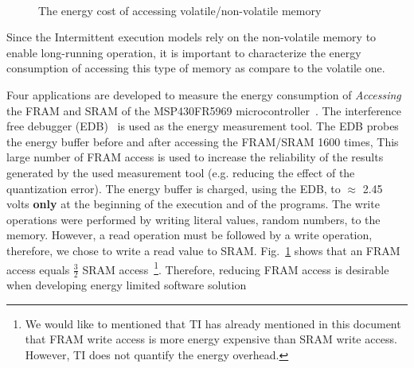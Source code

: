\documentclass[pageno]{jpaper}
\begin{document}
\begin{figure}[t]
    \centering
         \\
    \caption{The energy cost of accessing volatile/non-volatile memory}
    \label{fig:framEnergy}
\end{figure}

Since the Intermittent execution models rely on the non-volatile memory to enable long-running operation, it is important to characterize the energy consumption of accessing this type of memory as compare to the volatile one.

Four applications are developed to measure the energy consumption of \emph{Accessing} the FRAM and SRAM of the MSP430FR5969 microcontroller~\cite{xxx}. The interference free debugger (EDB)~\cite{xxx} is used as the energy measurement tool. The EDB probes the energy buffer before and after accessing the FRAM/SRAM 1600 times, This large number of FRAM access is used to increase the reliability of the results generated by the used measurement tool (e.g. reducing the effect of the quantization error).  The energy buffer is charged, using the EDB, to $\approx$ 2.45 volts \textbf{only} at the beginning of the execution and of the programs. The write operations were performed by writing literal values, random numbers, to the memory. However, a read operation must be followed by a write operation, therefore, we chose to write a read value to SRAM. Fig.~\ref{fig:framEnergy} shows that an FRAM access equals $\frac{3}{2}$ SRAM access~\footnote{We would like to mentioned that TI has already mentioned in this document~\cite{xxxx} that FRAM write access is more energy expensive than SRAM write access. However, TI does not quantify the energy overhead.}. Therefore, reducing FRAM access is desirable when developing  energy limited software solution  
\end{document}
